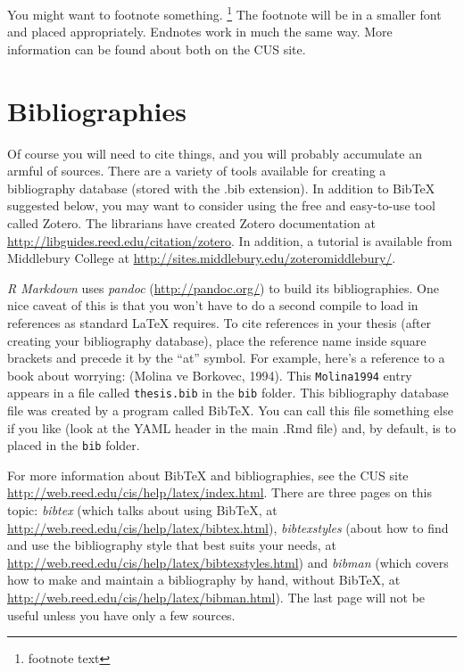\documentclass[12pt,twoside]{deuthesis}
\begin{document}
You might want to footnote something. \footnote{footnote text} The footnote will be in a smaller font and placed appropriately. Endnotes work in much the same way. More information can be found about both on the CUS site.

\hypertarget{bibliographies}{%
\section{Bibliographies}\label{bibliographies}}

Of course you will need to cite things, and you will probably accumulate an armful of sources. There are a variety of tools available for creating a bibliography database (stored with the .bib extension). In addition to BibTeX suggested below, you may want to consider using the free and easy-to-use tool called Zotero. The librarians have created Zotero documentation at \url{http://libguides.reed.edu/citation/zotero}. In addition, a tutorial is available from Middlebury College at \url{http://sites.middlebury.edu/zoteromiddlebury/}.

\emph{R Markdown} uses \emph{pandoc} (\url{http://pandoc.org/}) to build its bibliographies. One nice caveat of this is that you won't have to do a second compile to load in references as standard LaTeX requires. To cite references in your thesis (after creating your bibliography database), place the reference name inside square brackets and precede it by the ``at'' symbol. For example, here's a reference to a book about worrying: (Molina ve Borkovec, 1994). This \texttt{Molina1994} entry appears in a file called \texttt{thesis.bib} in the \texttt{bib} folder. This bibliography database file was created by a program called BibTeX. You can call this file something else if you like (look at the YAML header in the main .Rmd file) and, by default, is to placed in the \texttt{bib} folder.

For more information about BibTeX and bibliographies, see the CUS site \url{http://web.reed.edu/cis/help/latex/index.html}. There are three pages on this topic: \emph{bibtex} (which talks about using BibTeX, at \url{http://web.reed.edu/cis/help/latex/bibtex.html}), \emph{bibtexstyles} (about how to find and use the bibliography style that best suits your needs, at \url{http://web.reed.edu/cis/help/latex/bibtexstyles.html}) and \emph{bibman} (which covers how to make and maintain a bibliography by hand, without BibTeX, at \url{http://web.reed.edu/cis/help/latex/bibman.html}). The last page will not be useful unless you have only a few sources.
\end{document}
